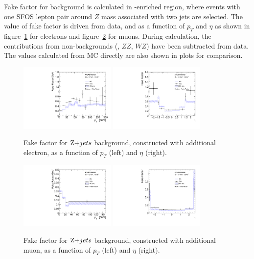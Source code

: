 Fake factor for \Zjet background is calculated in \Zjet-enriched region, where events with one SFOS lepton pair around $Z$ mass associated with two jets are selected.
The value of fake factor is driven from data, and as a function of $p_{T}$ and $\eta$ as shown in figure~\ref{fig:fake_zjet_el} for electrons and figure~\ref{fig:fake_zjet_mu} for muons.
During calculation, the contributions from non-\Zjet backgrounds (\ttbar, $ZZ$, $WZ$) have been subtracted from data.
The values calculated from \Zjet MC directly are also shown in plots for comparison.
\begin{figure}[!htb]
  \centering
  \includegraphics[width=0.42\textwidth]{figures/VBSZZ/fakebkg/Electron_2Dff_ptfakeFactorAddElectron_etapt_pavgy.pdf}
  \includegraphics[width=0.42\textwidth]{figures/VBSZZ/fakebkg/Electron_2Dff_etafakeFactorAddElectron_etapt_pavgx.pdf}
  \caption{Fake factor for $\Zjet$ background, constructed with additional electron, as a function of $p_{T}$ (left) and $\eta$ (right).}
  \label{fig:fake_zjet_el}
\end{figure}

\begin{figure}[!htb]
  \centering
  \includegraphics[width=0.42\textwidth]{figures/VBSZZ/fakebkg/Muon_2Dff_ptfakeFactorAddMuon_etapt_pavgy.pdf}
  \includegraphics[width=0.42\textwidth]{figures/VBSZZ/fakebkg/Muon_2Dff_etafakeFactorAddMuon_etapt_pavgx.pdf}
  \caption{Fake factor for $\Zjet$ background, constructed with additional muon, as a function of $p_{T}$ (left) and $\eta$ (right).}
  \label{fig:fake_zjet_mu}
\end{figure}

